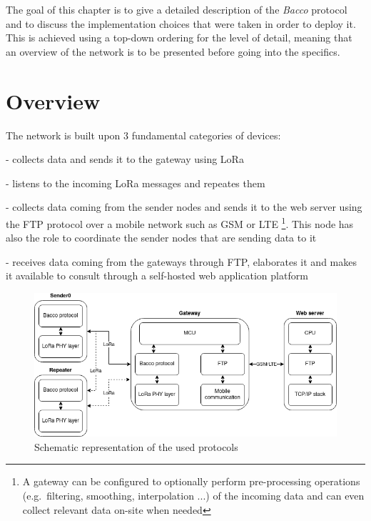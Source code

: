 The goal of this chapter is to give a detailed description of the \textit{Bacco} protocol and to discuss the
implementation choices that were taken in order to deploy it. This is achieved using a top-down ordering for the level
of detail, meaning that an overview of the network is to be presented before going into the specifics.

\section{Overview}
The network is built upon 3 fundamental categories of devices:

\begin{description}[font=$\bullet$~\normalfont\scshape\color{blue!50!black}]
    \item [Sender node] - collects data and sends it to the gateway using LoRa
    \item [Repeater node] - listens to the incoming LoRa messages and repeates them
    \item [Gateway node] - collects data coming from the sender nodes and sends it to the web server using the FTP
        protocol over a mobile network such as \gls{GSM} or \gls{LTE} \footnote{A gateway can be configured to optionally perform
        pre-processing operations (e.g.\ filtering, smoothing, interpolation ...) of the incoming data and can
        even collect relevant data on-site when needed}. This node has also the role to coordinate the sender nodes that are
        sending data to it
    \item [Web server] - receives data coming from the gateways through FTP, elaborates it and makes it available to
        consult through a self-hosted web application platform
\end{description}

\begin{figure}[ht]
    \centering
    \includegraphics[width=1.0\textwidth]{uml/network_stack.png}
    \caption{Schematic representation of the used protocols}
    \label{network stack img}
\end{figure}

